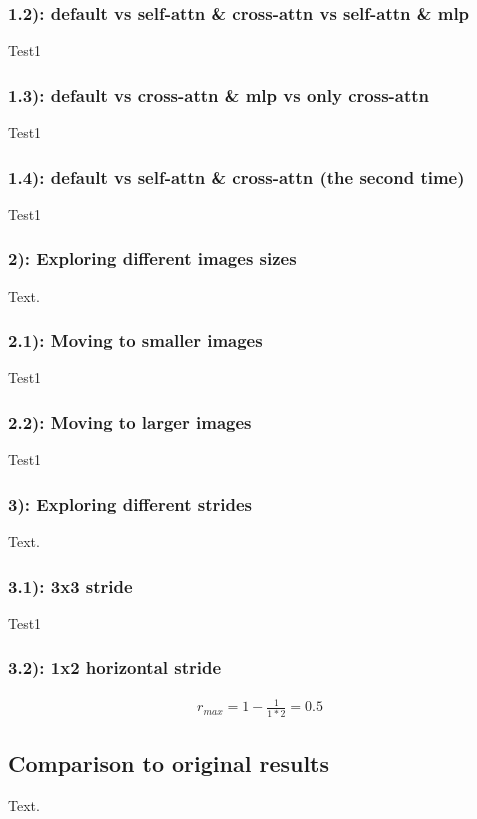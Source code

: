 \newpage
\begin{figure}
    
    
    
    
\end{figure}
\subsubsection*{1.2): default vs self-attn \& cross-attn vs self-attn \& mlp}
Test1

\subsubsection*{1.3): default vs cross-attn \& mlp vs only cross-attn}
Test1

\newpage
\begin{figure}
    
    
\end{figure}
\subsubsection*{1.4): default vs self-attn \& cross-attn (the second time)}
Test1

\newpage
\begin{figure}
    
    
\end{figure}
\subsubsection*{2): Exploring different images sizes}
Text.
\subsubsection*{2.1): Moving to smaller images}
Test1

\newpage
\subsubsection*{2.2): Moving to larger images}
Test1

\newpage
\begin{figure}
    
    
\end{figure}
\subsubsection*{3): Exploring different strides}
Text.
\subsubsection*{3.1): 3x3 stride}
Test1
\subsubsection*{3.2): 1x2 horizontal stride}
\begin{align*}
    r_{max} = 1-\frac{1}{1*2} = 0.5
\end{align*}

\newpage
\subsection{Comparison to original results}
Text.